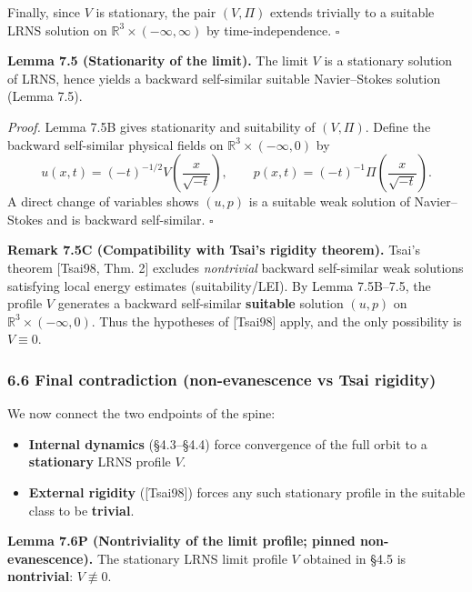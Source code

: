 \documentclass[
  11pt,
]{article}
\providecommand{\tightlist}{%
  \setlength{\itemsep}{0pt}\setlength{\parskip}{0pt}}
\begin{document}
Finally, since \(V\) is stationary, the pair \((V,\Pi)\) extends trivially to a suitable LRNS solution on \(\mathbb R^3\times(-\infty,\infty)\) by time-independence. \(\square\)

\textbf{Lemma 7.5 (Stationarity of the limit).} The limit \(V\) is a stationary solution of LRNS, hence yields a backward self-similar suitable Navier--Stokes solution (Lemma 7.5).

\emph{Proof.} Lemma 7.5B gives stationarity and suitability of \((V,\Pi)\). Define the backward self-similar physical fields on \(\mathbb R^3\times(-\infty,0)\) by \[
u(x,t)=(-t)^{-1/2}V\!\left(\frac{x}{\sqrt{-t}}\right),\qquad
p(x,t)=(-t)^{-1}\Pi\!\left(\frac{x}{\sqrt{-t}}\right).
\] A direct change of variables shows \((u,p)\) is a suitable weak solution of Navier--Stokes and is backward self-similar. \(\square\)

\textbf{Remark 7.5C (Compatibility with Tsai's rigidity theorem).} Tsai's theorem {[}Tsai98, Thm. 2{]} excludes \emph{nontrivial} backward self-similar weak solutions satisfying local energy estimates (suitability/LEI). By Lemma 7.5B--7.5, the profile \(V\) generates a backward self-similar \textbf{suitable} solution \((u,p)\) on \(\mathbb R^3\times(-\infty,0)\). Thus the hypotheses of {[}Tsai98{]} apply, and the only possibility is \(V\equiv 0\).

\hypertarget{final-contradiction-non-evanescence-vs-tsai-rigidity}{%
\subsubsection{6.6 Final contradiction (non-evanescence vs Tsai rigidity)}\label{final-contradiction-non-evanescence-vs-tsai-rigidity}}

We now connect the two endpoints of the spine:

\begin{itemize}
\tightlist
\item
  \textbf{Internal dynamics} (§4.3--§4.4) force convergence of the full orbit to a \textbf{stationary} LRNS profile \(V\).
\item
  \textbf{External rigidity} ({[}Tsai98{]}) forces any such stationary profile in the suitable class to be \textbf{trivial}.
\end{itemize}

\textbf{Lemma 7.6P (Nontriviality of the limit profile; pinned non-evanescence).} The stationary LRNS limit profile \(V\) obtained in §4.5 is \textbf{nontrivial}: \(V\not\equiv 0\).
\end{document}
